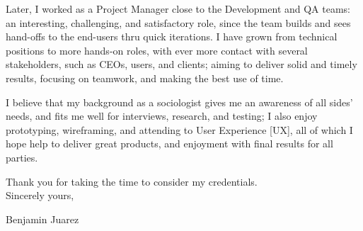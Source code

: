 Later, I worked as a Project Manager close to the Development and QA teams:
an interesting, challenging, and satisfactory role, 
since the team builds and sees 
hand-offs to the end-users thru quick iterations.
I have grown from technical positions to more hands-on roles, with ever more contact 
with several stakeholders, such as CEOs, users, and clients; 
aiming to deliver solid and timely results, 
focusing on teamwork, 
and making the best use of time.

I believe that my background 
as a sociologist gives me an awareness of all sides' needs, 
and fits me well for interviews, research, and testing;
I also enjoy prototyping, wireframing, and attending to User Experience [UX], 
all of which I hope help to deliver great products, and enjoyment with final results for all parties.


% 

Thank you for taking the time to consider my credentials. \\
\bigskip %
Sincerely yours,


Benjamin Juarez


